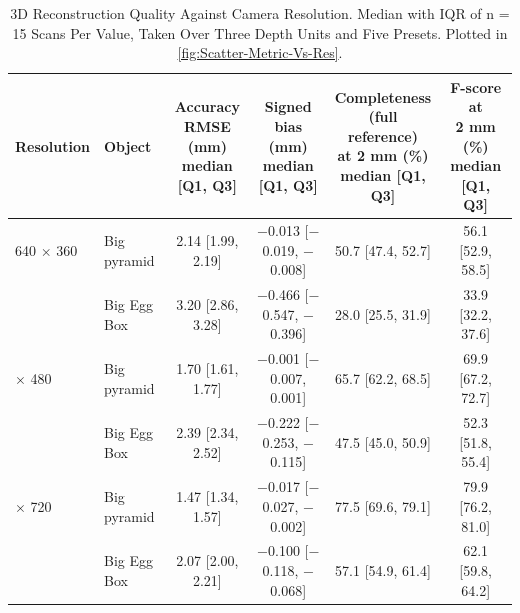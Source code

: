 \begin{table}[H]
	\centering
	\footnotesize
	\setlength{\tabcolsep}{4pt}
	\caption{3D Reconstruction Quality Against Camera Resolution. Median with IQR of n = 15 Scans Per Value, Taken Over Three Depth Units and Five Presets. Plotted in \autoref{fig:Scatter-Metric-Vs-Res}.}
	\label{tab:Scatter_Metric_Vs_Res}
	\begin{tabular}{l l *{4}{c}}
		\toprule
		Resolution & Object & \makecell{Accuracy\\RMSE (mm)\\{\scriptsize median [Q1, Q3]}} & \makecell{Signed\\bias (mm)\\{\scriptsize median [Q1, Q3]}} & \makecell{Completeness\\(full reference)\\at 2 mm (\%)\\{\scriptsize median [Q1, Q3]}} & \makecell{F-score at\\2 mm (\%)\\{\scriptsize median [Q1, Q3]}} \\
		\midrule
		640 $\times$ 360 & Big pyramid & 2.14 [1.99, 2.19] & $-$0.013 [$-$0.019, $-$0.008] & 50.7 [47.4, 52.7] & 56.1 [52.9, 58.5] \\
		 & Big Egg Box & 3.20 [2.86, 3.28] & $-$0.466 [$-$0.547, $-$0.396] & 28.0 [25.5, 31.9] & 33.9 [32.2, 37.6] \\
		\addlinespace
		848 $\times$ 480 & Big pyramid & 1.70 [1.61, 1.77] & $-$0.001 [$-$0.007, 0.001] & 65.7 [62.2, 68.5] & 69.9 [67.2, 72.7] \\
		 & Big Egg Box & 2.39 [2.34, 2.52] & $-$0.222 [$-$0.253, $-$0.115] & 47.5 [45.0, 50.9] & 52.3 [51.8, 55.4] \\
		\addlinespace
		1280 $\times$ 720 & Big pyramid & 1.47 [1.34, 1.57] & $-$0.017 [$-$0.027, $-$0.002] & 77.5 [69.6, 79.1] & 79.9 [76.2, 81.0] \\
		 & Big Egg Box & 2.07 [2.00, 2.21] & $-$0.100 [$-$0.118, $-$0.068] & 57.1 [54.9, 61.4] & 62.1 [59.8, 64.2] \\
		\bottomrule
	\end{tabular}
\end{table}
